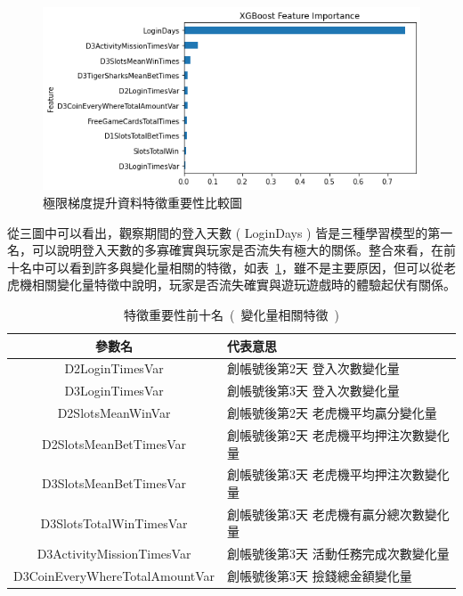 \begin{figure}[!htb]
    \begin{center}
      \includegraphics[width=1\textwidth]{figures/evaluation/Image_XGBFeatureImportances.png}
      \caption[極限梯度提升資料特徵重要性比較圖]{極限梯度提升資料特徵重要性比較圖}
      \label{fig:eva_XGBFeatureImportances}
    \end{center}
\end{figure}
\newpage

從三圖中可以看出，觀察期間的登入天數 ( LoginDays ) 皆是三種學習模型的第一名，可以說明登入天數的多寡確實與玩家是否流失有極大的關係。整合來看，在前十名中可以看到許多與變化量相關的特徵，如表~\ref{tab:FeatureImportanceTop10}，雖不是主要原因，但可以從老虎機相關變化量特徵中說明，玩家是否流失確實與遊玩遊戲時的體驗起伏有關係。

\begin{table}[!htb]
    \centering
        \begin{tabular}{cl}
            \hline \hline
            參數名 & 代表意思 \\
            \hline \hline
            D2LoginTimesVar & 創帳號後第2天 登入次數變化量 \\
            \hline
            D3LoginTimesVar & 創帳號後第3天 登入次數變化量 \\
            \hline
            D2SlotsMeanWinVar & 創帳號後第2天 老虎機平均贏分變化量 \\
            \hline
            D2SlotsMeanBetTimesVar & 創帳號後第2天 老虎機平均押注次數變化量 \\
            \hline
            D3SlotsMeanBetTimesVar & 創帳號後第3天 老虎機平均押注次數變化量 \\
            \hline
            D3SlotsTotalWinTimesVar & 創帳號後第3天 老虎機有贏分總次數變化量 \\
            \hline
            D3ActivityMissionTimesVar & 創帳號後第3天 活動任務完成次數變化量 \\
            \hline
            D3CoinEveryWhereTotalAmountVar & 創帳號後第3天 撿錢總金額變化量 \\
            \hline \hline
        \end{tabular}
    \caption[特徵重要性前十名]{特徵重要性前十名\ (\ 變化量相關特徵\ )}
    \label{tab:FeatureImportanceTop10}
\end{table}

